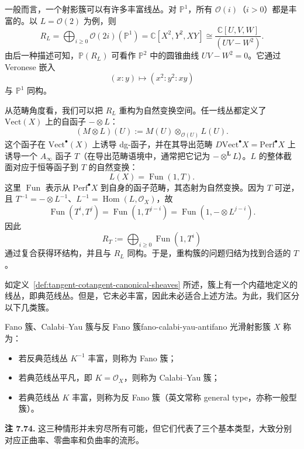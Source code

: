 \begin{example}[射影直线上的丰富线丛]
一般而言，一个射影簇可以有许多丰富线丛。对 $\mathbb P^1$，所有 $\mathcal O(i)$（$i>0$）都是丰富的。以 $L=\mathcal O(2)$ 为例，则
\[
  R_L=\bigoplus_{i\geq0}\mathcal O(2i)(\mathbb P^1)
  =\mathbb C[X^2,Y^2,XY]
  \cong\frac{\mathbb C[U,V,W]}{(UV-W^2)}.
\]
由后一种描述可知，$\mathbb P(R_L)$ 可看作 $\mathbb P^2$ 中的圆锥曲线 $UV-W^2=0$。它通过 Veronese 嵌入
\[
  (x:y)\longmapsto(x^2:y^2:xy)
\]
与 $\mathbb P^1$ 同构。
\end{example}

从范畴角度看，我们可以把 $R_L$ 重构为自然变换空间。任一线丛都定义了 $\mathrm{Vect}(X)$ 上的自函子 $-\otimes L$：
\[
  (M\otimes L)(U):=M(U)\otimes_{\mathcal O(U)}L(U).
\]
这个函子在 $\mathrm{Vect}^{\bullet}(X)$ 上诱导 dg-函子，并在其导出范畴 $D\mathrm{Vect}^{\bullet}X=\mathrm{Perf}^{\bullet}X$ 上诱导一个 $A_\infty$ 函子 $T$（在导出范畴语境中，通常把它记为 $-\otimes^{\mathbf L}L$）。$L$ 的整体截面对应于恒等函子到 $T$ 的自然变换：
\[
  L(X)=\operatorname{Fun}(1,T).
\]
这里 $\operatorname{Fun}$ 表示从 $\mathrm{Perf}^{\bullet}X$ 到自身的函子范畴，其态射为自然变换。因为 $T$ 可逆，且 $T^{-1}=-\otimes L^{-1}$、$L^{-1}=\operatorname{Hom}(L,\mathcal O_X)$，故
\[
  \operatorname{Fun}(T^i,T^j)
  =\operatorname{Fun}(1,T^{j-i})
  =\operatorname{Fun}(1,-\otimes L^{j-i}).
\]
因此
\[
  R_T:=\bigoplus_{i\geq0}\operatorname{Fun}(1,T^i)
\]
通过复合获得环结构，并且与 $R_L$ 同构。于是，重构簇的问题归结为找到合适的 $T$。

如定义~\ref{def:tangent-cotangent-canonical-sheaves} 所述，簇上有一个内蕴地定义的线丛，即典范线丛。但是，它未必丰富，因此未必适合上述方法。为此，我们区分以下几类簇。

\begin{definition}{Fano 簇、Calabi--Yau 簇与反 Fano 簇}{fano-calabi-yau-antifano}
光滑射影簇 $X$ 称为：
\begin{itemize}
  \item 若反典范线丛 $K^{-1}$ 丰富，则称为 Fano 簇；
  \item 若典范线丛平凡，即 $K=\mathcal O_X$，则称为 Calabi--Yau 簇；
  \item 若典范线丛 $K$ 丰富，则称为反 Fano 簇（英文常称 general type，亦称一般型簇）。
\end{itemize}
\end{definition}

\begin{note}\label{note:three-variety-types-curvature}
\textbf{注 7.74.} 这三种情形并未穷尽所有可能，但它们代表了三个基本类型，大致分别对应正曲率、零曲率和负曲率的流形。
\end{note}

